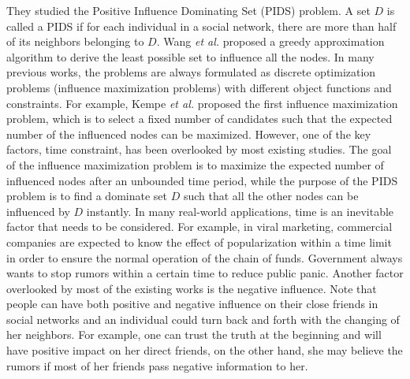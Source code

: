 They studied the Positive Influence Dominating Set (PIDS) problem.
A set $D$ is called a PIDS if for each individual in a social network, there are more than half of its neighbors belonging to $D$.
Wang {\it et al.} proposed a greedy approximation algorithm to derive the least possible set to influence all the nodes.
In many previous works, the problems are always formulated as discrete optimization problems (influence maximization problems) with different object functions and constraints.
For example, Kempe {\it et al.} \cite{KKT2003} proposed the first influence maximization problem, which is to select a fixed number of candidates such that the
expected number of the influenced nodes can be maximized.
However, one of the key factors, time constraint, has been overlooked by most existing studies.
The goal of the influence maximization problem is to maximize the expected number of influenced nodes after an unbounded time period,
while the purpose of the PIDS problem is to find a dominate set $D$ such that all the other nodes can be influenced by $D$ instantly.
In many real-world applications, time is an inevitable factor that needs to be considered.
For example, in viral marketing, commercial companies are expected to know the effect of popularization within a time limit in order to ensure the normal
operation of the chain of funds.
Government always wants to stop rumors within a certain time to reduce public panic.
Another factor overlooked by most of the existing works is the negative influence.
Note that people can have both positive and negative influence on their close friends in social networks
and an individual could turn back and forth with the changing of her neighbors.
For example, one can trust the truth at the beginning and will have positive impact on her direct friends, on the other hand, she may believe the rumors if most of her friends pass negative
information to her.

